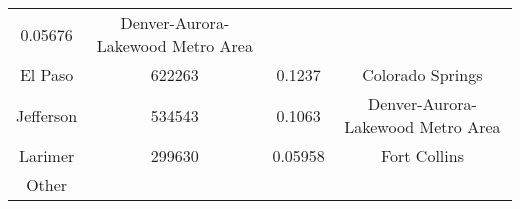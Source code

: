 \documentclass[12pt,twoside]{reedthesis}
\begin{document}
\begin{longtable}[]{@{}cccc@{}}
\begin{minipage}[t]{0.20\columnwidth}
  0.05676\strut
  \end{minipage} & \begin{minipage}[t]{0.34\columnwidth}\centering\strut
  Denver-Aurora-Lakewood Metro Area\strut
  \end{minipage}\tabularnewline
  \begin{minipage}[t]{0.13\columnwidth}\centering\strut
  El Paso\strut
  \end{minipage} & \begin{minipage}[t]{0.21\columnwidth}\centering\strut
  622263\strut
  \end{minipage} & \begin{minipage}[t]{0.20\columnwidth}\centering\strut
  0.1237\strut
  \end{minipage} & \begin{minipage}[t]{0.34\columnwidth}\centering\strut
  Colorado Springs\strut
  \end{minipage}\tabularnewline
  \begin{minipage}[t]{0.13\columnwidth}\centering\strut
  Jefferson\strut
  \end{minipage} & \begin{minipage}[t]{0.21\columnwidth}\centering\strut
  534543\strut
  \end{minipage} & \begin{minipage}[t]{0.20\columnwidth}\centering\strut
  0.1063\strut
  \end{minipage} & \begin{minipage}[t]{0.34\columnwidth}\centering\strut
  Denver-Aurora-Lakewood Metro Area\strut
  \end{minipage}\tabularnewline
  \begin{minipage}[t]{0.13\columnwidth}\centering\strut
  Larimer\strut
  \end{minipage} & \begin{minipage}[t]{0.21\columnwidth}\centering\strut
  299630\strut
  \end{minipage} & \begin{minipage}[t]{0.20\columnwidth}\centering\strut
  0.05958\strut
  \end{minipage} & \begin{minipage}[t]{0.34\columnwidth}\centering\strut
  Fort Collins\strut
  \end{minipage}\tabularnewline
  \begin{minipage}[t]{0.13\columnwidth}\centering\strut
  Other\strut
  \end{minipage} & \begin{minipage}[t]{0.21\columnwidth}\centering\strut

\end{minipage}
\end{longtable}
\end{document}

